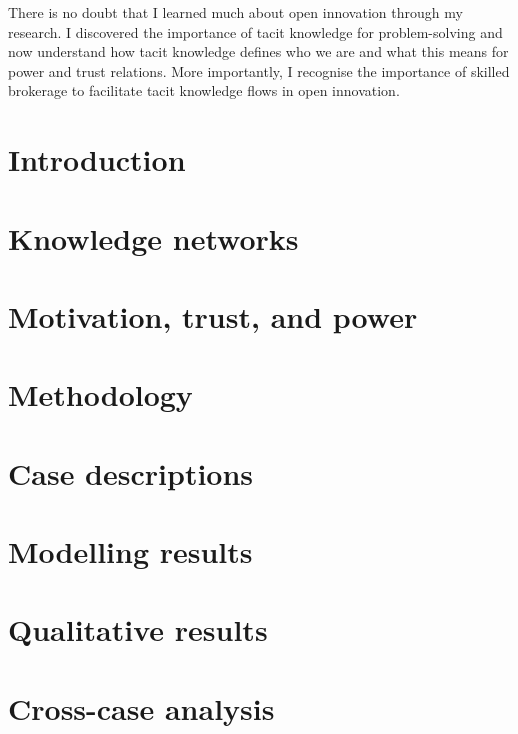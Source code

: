 \documentclass[12pt,table]{book}
\begin{document}
There is no doubt that I learned much about open innovation through my research. I discovered the importance of tacit knowledge for problem-solving and now understand how tacit knowledge defines who we are and what this means for power and trust relations. More importantly, I recognise the importance of skilled brokerage to facilitate tacit knowledge flows in open innovation. 

\newpage
\setcounter{tocdepth}{3}
\tableofcontents

\newpage

\listoffigures

\newpage

\listoftables

\mainmatter

\chapter{Introduction}


\chapter{Knowledge networks}


\chapter{Motivation, trust, and power}


\chapter{Methodology}


\chapter{Case descriptions}


\chapter{Modelling results}

%
\chapter{Qualitative results}

%
\chapter{Cross-case analysis}

%
\end{document}
